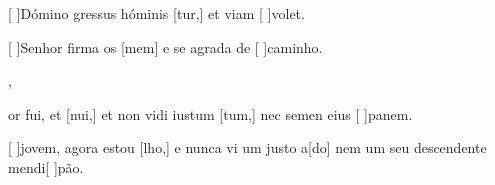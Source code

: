{  %
  {\item {}[ ]{Dó}mino gressus hóminis [tur,] et viam [ ]{vo}let.}%
    {\item {}[ ]{Se}nhor firma os [mem] e se agrada de [ ]{ca}{mi}nho.},
  {\item {}or fui, et [nui,] et non vidi iustum [tum,] nec semen eius [ ]{pa}nem.}%
    {\item {}[ ]{jo}vem, agora estou [lho,] e nunca vi um justo a[do] nem um seu descendente mendi[ ]{pão}.}
}